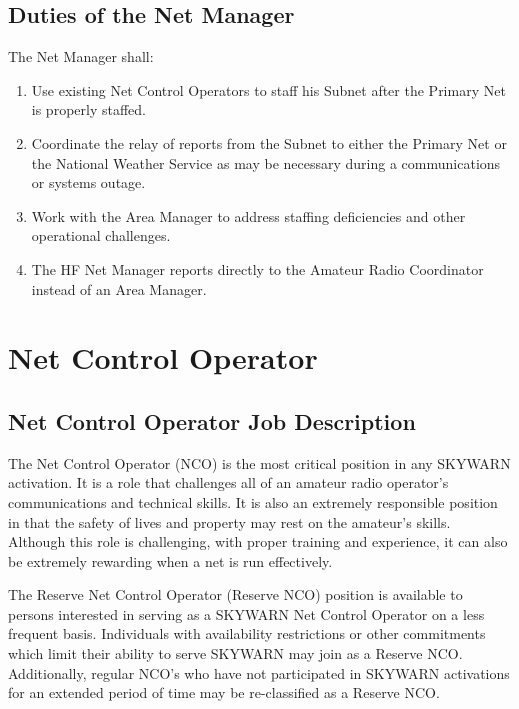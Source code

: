 \documentclass[pdflatex,letterpaper,twoside,12pt]{book}
\begin{document}
\subsection{Duties of the Net Manager}

The Net Manager shall:

\begin{enumerate}
\item Use existing Net Control Operators to staff his Subnet after the Primary Net is properly staffed.
\item Coordinate the relay of reports from the Subnet to either the Primary Net or the National Weather Service as may be necessary during a communications or systems outage.
\item Work with the Area Manager to address staffing deficiencies and other operational challenges.
\item The HF Net Manager reports directly to the Amateur Radio Coordinator instead of an Area Manager.
\end{enumerate}


\section{Net Control Operator}

\subsection{Net Control Operator Job Description}

The Net Control Operator (NCO) is the most critical position in any SKYWARN activation.  It is a role that challenges all of an amateur radio operator's communications and technical skills.  It is also an extremely responsible position in that the safety of lives and property may rest on the amateur's skills.  Although this role is challenging, with proper training and experience, it can also be extremely rewarding when a net is run effectively.

The Reserve Net Control Operator (Reserve NCO) position is available to persons interested in serving as a SKYWARN Net Control Operator on a less frequent basis.  Individuals with availability restrictions or other commitments which limit their ability to serve SKYWARN may join as a Reserve NCO.  Additionally, regular NCO's who have not participated in SKYWARN activations for an extended period of time may be re-classified as a Reserve NCO.
\end{document}
